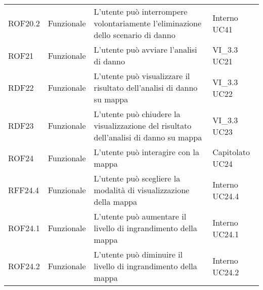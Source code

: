 \begin{longtable}{p{2cm}!{\VRule[1pt]}p{2cm}!{\VRule[1pt]}p{5cm}!{\VRule[1pt]}p{1.5cm}}
	\\
	ROF20.2                          & Funzionale\newline               & L'utente può interrompere volontariamente l'eliminazione dello scenario di danno                                         & Interno \newline UC41        
	\\
	ROF21                            & Funzionale\newline               & L'utente può avviare l'analisi di danno                                                                                  & VI_3.3 \newline UC21         
	\\
	RDF22                            & Funzionale\newline               & L'utente può visualizzare il risultato dell'analisi di danno su mappa                                                    & VI_3.3 \newline UC22         
	\\
	RDF23                            & Funzionale\newline               & L'utente può chiudere la visualizzazione del risultato dell'analisi di danno su mappa                                    & VI_3.3 \newline UC23         
	\\
	ROF24                            & Funzionale\newline               & L'utente può interagire con la mappa                                                                                     & Capitolato \newline UC24     
	\\
	RFF24.4                          & Funzionale\newline               & L'utente può scegliere la  modalità  di visualizzazione della mappa                                                     & Interno \newline UC24.4      
	\\
	ROF24.1                          & Funzionale\newline               & L'utente può aumentare il livello di ingrandimento della mappa                                                           & Interno \newline UC24.1      
	\\
	ROF24.2                          & Funzionale\newline               & L'utente può diminuire il livello di ingrandimento della mappa                                                           & Interno \newline UC24.2      

\end{longtable}
